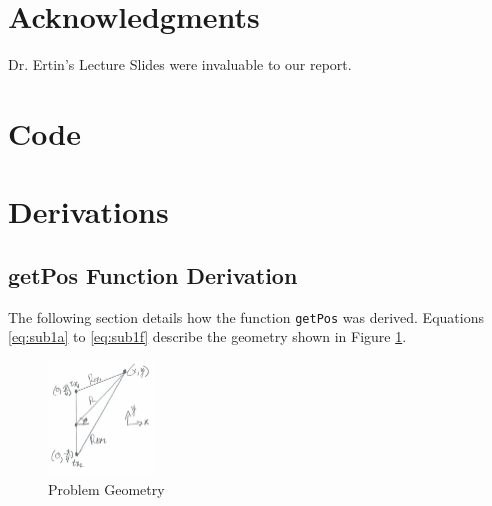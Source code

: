 \documentclass{article}
\begin{document}
\section{Acknowledgments}
Dr. Ertin's Lecture Slides \cite{lecSlides} were invaluable to our report.
\printbibliography

\appendix
\section{Code}





 \label{lst:dataCode}

\newpage

\section{Derivations}
\subsection{getPos Function Derivation}
The following section details how the \MATLAB function \verb|getPos| was derived. Equations \ref{eq:sub1a} to \ref{eq:sub1f} describe the geometry shown in Figure \ref{fig:probGeometry}.

\begin{figure}[H]
    \centering
    \includegraphics[width=0.25\textwidth]{figures/geometry.jpg}
    \caption{Problem Geometry}
    \label{fig:probGeometry}
\end{figure}
\end{document}
